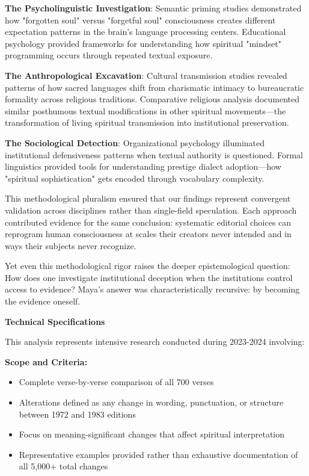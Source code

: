\documentclass[12pt,twoside]{book}
\begin{document}
\textbf{\textbf{The Psycholinguistic Investigation}}: Semantic priming studies demonstrated how "forgotten soul" versus "forgetful soul" consciousness creates different expectation patterns in the brain's language processing centers. Educational psychology provided frameworks for understanding how spiritual "mindset" programming occurs through repeated textual exposure.

\textbf{\textbf{The Anthropological Excavation}}: Cultural transmission studies revealed patterns of how sacred languages shift from charismatic intimacy to bureaucratic formality across religious traditions. Comparative religious analysis documented similar posthumous textual modifications in other spiritual movements—the transformation of living spiritual transmission into institutional preservation.

\textbf{\textbf{The Sociological Detection}}: Organizational psychology illuminated institutional defensiveness patterns when textual authority is questioned. Formal linguistics provided tools for understanding prestige dialect adoption—how "spiritual sophistication" gets encoded through vocabulary complexity.

This methodological pluralism ensured that our findings represent convergent validation across disciplines rather than single-field speculation. Each approach contributed evidence for the same conclusion: systematic editorial choices can reprogram human consciousness at scales their creators never intended and in ways their subjects never recognize.

Yet even this methodological rigor raises the deeper epistemological question: How does one investigate institutional deception when the institutions control access to evidence? Maya's answer was characteristically recursive: by becoming the evidence oneself.

\textbf{Technical Specifications}

This analysis represents intensive research conducted during 2023-2024 involving:

\textbf{\textbf{Scope and Criteria:}}
\begin{itemize}
\item Complete verse-by-verse comparison of all 700 verses
\item Alterations defined as any change in wording, punctuation, or structure between 1972 and 1983 editions
\item Focus on meaning-significant changes that affect spiritual interpretation
\item Representative examples provided rather than exhaustive documentation of all 5,000+ total changes
\end{itemize}
\end{document}
